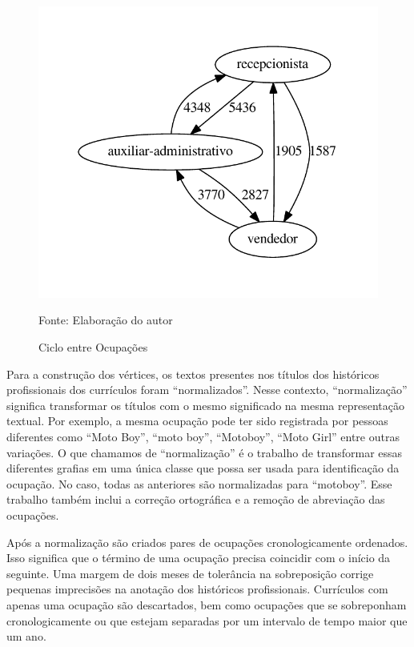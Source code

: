 \documentclass[12pt,a4paper]{article}
\theoremstyle{hypo}
\newcommand{\source}[1]{\vspace{-10pt} \caption*{Fonte: {#1}} }
\begin{document}
\begin{figure}[ht]
  \centering
  \includegraphics[scale=0.8]{ciclo-operacional.pdf}
  \caption{Ciclo entre Ocupações}
  \source{Elaboração do autor}
  \label{fig:grafo-ciclo-operacional}
\end{figure}

Para a construção dos vértices, os textos presentes nos títulos dos históricos profissionais dos currículos foram \enquote{normalizados}. Nesse contexto, \enquote{normalização} significa transformar os títulos com o mesmo significado na mesma representação textual. Por exemplo, a mesma ocupação pode ter sido registrada por pessoas diferentes como \enquote{Moto Boy}, \enquote{moto boy}, \enquote{Motoboy}, \enquote{Moto Girl} entre outras variações. O que chamamos de \enquote{normalização} é o trabalho de transformar essas diferentes grafias em uma única classe que possa ser usada para identificação da ocupação. No caso, todas as anteriores são normalizadas para \enquote{motoboy}. Esse trabalho também inclui a correção ortográfica e a remoção de abreviação das ocupações.

Após a normalização são criados pares de ocupações cronologicamente ordenados. Isso significa que o término de uma ocupação precisa coincidir com o início da seguinte. Uma margem de dois meses de tolerância na sobreposição corrige pequenas imprecisões na anotação dos históricos profissionais. Currículos com apenas uma ocupação são descartados, bem como ocupações que se sobreponham cronologicamente ou que estejam separadas por um intervalo de tempo maior que um ano.
\end{document}
